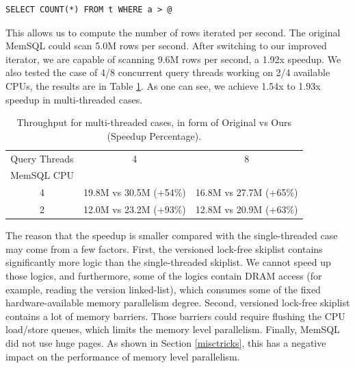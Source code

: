 \documentclass[11pt, usletter]{article}
\begin{document}
\singlespacing\begin{codebox}
\begin{verbatim}
SELECT COUNT(*) FROM t WHERE a > @
\end{verbatim}
\end{codebox}\doublespacing

This allows us to compute the number of rows iterated per second. 
The original MemSQL could scan 5.0M rows per second. 
After switching to our improved iterator, we are capable of scanning 9.6M rows per second, a 1.92x speedup. 
We also tested the case of 4/8 concurrent query threads working on 2/4 available CPUs, 
the results are in Table \ref{sliter_memsql_mt}. As one can see, we achieve 1.54x to 1.93x speedup in multi-threaded cases.
 
 \begin{table}[!htb]
   \begin{tabular}{|c|l|l|}
   \hline
Query Threads & \multicolumn{1}{c|}{4}                                                            & \multicolumn{1}{c|}{8}                                                            \\
MemSQL CPU    &                                                                                  &                                                                                  \\
\hline
4          & 19.8M vs 30.5M (+54\%) & 16.8M vs 27.7M (+65\%) \\
\hline
2         & 12.0M vs 23.2M (+93\%) & 12.8M vs 20.9M (+63\%) \\
\hline
\end{tabular}
\caption{Throughput for multi-threaded cases, in form of Original vs Ours (Speedup Percentage).}
\label{sliter_memsql_mt}
\end{table}

The reason that the speedup is smaller compared with the single-threaded case may come from a few factors. 
First, the versioned lock-free skiplist contains significantly more logic than the single-threaded skiplist. 
We cannot speed up those logics, and furthermore, some of the logics contain DRAM access (for example, 
reading the version linked-list), which consumes some of the fixed hardware-available memory parallelism degree. 
Second, versioned lock-free skiplist contains a lot of memory barriers. 
Those barriers could require flushing the CPU load/store queues, which limits the memory level parallelism. 
Finally, MemSQL did not use huge pages. 
As shown in Section \ref{misctricks}, this has a negative impact on the performance of memory level parallelism.
\end{document}
